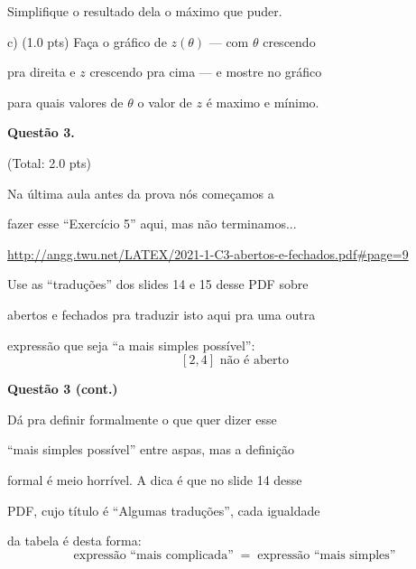 \documentclass[oneside,12pt]{article}
\begin{document}
Simplifique o resultado dela o máximo que puder.

\msk

c) \B(1.0 pts) Faça o gráfico de $z(θ)$ --- com $θ$ crescendo

pra direita e $z$ crescendo pra cima --- e mostre no gráfico

para quais valores de $θ$ o valor de $z$ é maximo e mínimo.






\newpage


{\bf Questão 3.}

\T(Total: 2.0 pts)

\ssk

Na última aula antes da prova nós começamos a

fazer esse ``Exercício 5'' aqui, mas não terminamos...

\ssk

{\scriptsize

\url{http://angg.twu.net/LATEX/2021-1-C3-abertos-e-fechados.pdf#page=9}

}

\ssk

Use as ``traduções'' dos slides 14 e 15 desse PDF sobre

abertos e fechados pra traduzir isto aqui pra uma outra

expressão que seja ``a mais simples possível'':
%
$$[2,4] \text{ não é aberto}$$



\newpage


{\bf Questão 3 (cont.)}

\ssk

Dá pra definir formalmente o que quer dizer esse 

``mais simples possível'' entre aspas, mas a definição

formal é meio horrível. A dica é que no slide 14 desse

PDF, cujo título é ``Algumas traduções'', cada igualdade

da tabela é desta forma:
%
$$\text{expressão ``mais complicada''}
  \;\;=\;\;
  \text{expressão ``mais simples''}
$$
\end{document}
